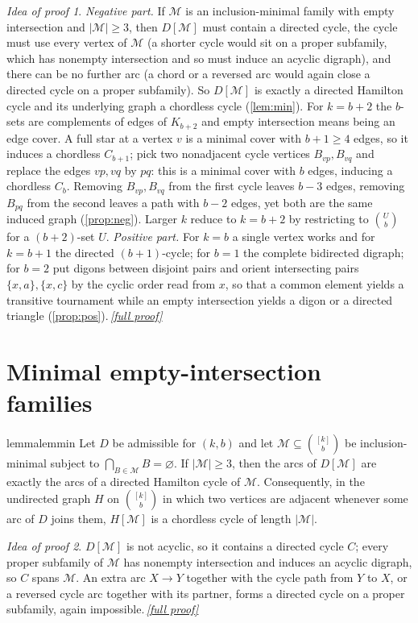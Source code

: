 \documentclass[11pt,a4paper]{article}
\theoremstyle{plain}
\theoremstyle{definition}
\theoremstyle{remark}
\newtheorem*{proofidea}{Idea of proof}
\newcommand{\fullproofref}[1]{\,\hyperref[#1]{\textit{[full proof]}}}
\newcommand{\cM}{\mathcal M}
\newcommand{\kb}{\binom{[k]}{b}}
\begin{document}
\begin{proofidea}
\emph{Negative part.} If $\cM$ is an inclusion-minimal family with empty intersection and $|\cM|\ge3$, then $D[\cM]$ must contain a directed cycle, the cycle must use every vertex of $\cM$ (a shorter cycle would sit on a proper subfamily, which has nonempty intersection and so must induce an acyclic digraph), and there can be no further arc (a chord or a reversed arc would again close a directed cycle on a proper subfamily). So $D[\cM]$ is exactly a directed Hamilton cycle and its underlying graph a chordless cycle (\cref{lem:min}). For $k=b+2$ the $b$-sets are complements of edges of $K_{b+2}$ and empty intersection means being an edge cover. A full star at a vertex $v$ is a minimal cover with $b+1\ge4$ edges, so it induces a chordless $C_{b+1}$; pick two nonadjacent cycle vertices $B_{vp},B_{vq}$ and replace the edges $vp,vq$ by $pq$: this is a minimal cover with $b$ edges, inducing a chordless $C_{b}$. Removing $B_{vp},B_{vq}$ from the first cycle leaves $b-3$ edges, removing $B_{pq}$ from the second leaves a path with $b-2$ edges, yet both are the same induced graph (\cref{prop:neg}). Larger $k$ reduce to $k=b+2$ by restricting to $\binom{U}{b}$ for a $(b+2)$-set $U$.
\emph{Positive part.} For $k=b$ a single vertex works and for $k=b+1$ the directed $(b+1)$-cycle; for $b=1$ the complete bidirected digraph; for $b=2$ put digons between disjoint pairs and orient intersecting pairs $\{x,a\},\{x,c\}$ by the cyclic order read from $x$, so that a common element yields a transitive tournament while an empty intersection yields a digon or a directed triangle (\cref{prop:pos}).\fullproofref{pf:main}
\end{proofidea}

\section{Minimal empty-intersection families}

\begin{restatable}{lemma}{lemmin}\label{lem:min}
Let $D$ be admissible for $(k,b)$ and let $\cM\subseteq\kb$ be inclusion-minimal subject to $\bigcap_{B\in\cM}B=\varnothing$. If $|\cM|\ge3$, then the arcs of $D[\cM]$ are exactly the arcs of a directed Hamilton cycle of $\cM$. Consequently, in the undirected graph $H$ on $\kb$ in which two vertices are adjacent whenever some arc of $D$ joins them, $H[\cM]$ is a chordless cycle of length $|\cM|$.
\end{restatable}
\begin{proofidea}
$D[\cM]$ is not acyclic, so it contains a directed cycle $C$; every proper subfamily of $\cM$ has nonempty intersection and induces an acyclic digraph, so $C$ spans $\cM$. An extra arc $X\to Y$ together with the cycle path from $Y$ to $X$, or a reversed cycle arc together with its partner, forms a directed cycle on a proper subfamily, again impossible.\fullproofref{pf:min}
\end{proofidea}
\end{document}
